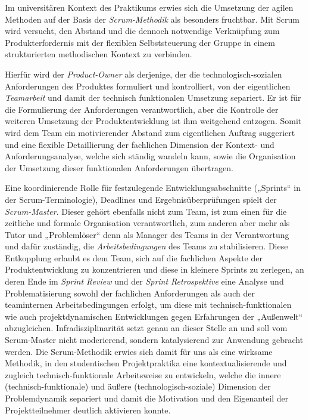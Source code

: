 \documentclass[a4paper,11pt]{article}
\begin{document}
Im universitären Kontext des Praktikums erwies sich die Umsetzung der agilen
Methoden auf der Basis der \emph{Scrum-Methodik} als besonders fruchtbar. Mit
Scrum wird versucht, den Abstand und die dennoch notwendige Verknüpfung zum
Produkterfordernis mit der flexiblen Selbststeuerung der Gruppe in einem
strukturierten methodischen Kontext zu verbinden.

Hierfür wird der \emph{Product-Owner} als derjenige, der die
technologisch-sozialen Anforderungen des Produktes formuliert und
kontrolliert, von der eigentlichen \emph{Teamarbeit} und damit der technisch
funktionalen Umsetzung separiert. Er ist für die Formulierung der
Anforderungen verantwortlich, aber die Kontrolle der weiteren Umsetzung der
Produktentwicklung ist ihm weitgehend entzogen. Somit wird dem Team ein
motivierender Abstand zum eigentlichen Auftrag suggeriert und eine flexible
Detaillierung der fachlichen Dimension der Kontext- und Anforderungsanalyse,
welche sich ständig wandeln kann, sowie die Organisation der Umsetzung dieser
funktionalen Anforderungen übertragen.

Eine koordinierende Rolle für festzulegende Entwicklungsabschnitte („Sprints“
in der Scrum-Terminologie), Deadlines und Ergebnisüberprüfungen spielt der
\emph{Scrum-Master}. Dieser gehört ebenfalls nicht zum Team, ist zum einen für
die zeitliche und formale Organisation verantwortlich, zum anderen aber mehr
als Tutor und „Problemlöser“ denn als Manager des Teams in der Verantwortung
und dafür zuständig, die \emph{Arbeitsbedingungen} des Teams zu
stabilisieren. Diese Entkopplung erlaubt es dem Team, sich auf die fachlichen
Aspekte der Produktentwicklung zu konzentrieren und diese in kleinere Sprints
zu zerlegen, an deren Ende im \emph{Sprint Review} und der \emph{Sprint
  Retrospektive} eine Analyse und Problematisierung sowohl der fachlichen
Anforderungen als auch der teaminternen Arbeitsbedingungen erfolgt, um diese
mit technisch-funktionalen wie auch projektdynamischen Entwicklungen gegen
Erfahrungen der „Außenwelt“ abzugleichen. Infradisziplinarität setzt genau an
dieser Stelle an und soll vom Scrum-Master nicht moderierend, sondern
katalysierend zur Anwendung gebracht werden. Die Scrum-Methodik erwies sich
damit für uns als eine wirksame Methodik, in den studentischen Projektpraktika
eine kontextualisierende und zugleich technisch-funktionale Arbeitsweise zu
entwickeln, welche die innere (technisch-funktionale) und äußere
(technologisch-soziale) Dimension der Problemdynamik separiert und damit die
Motivation und den Eigenanteil der Projektteilnehmer deutlich aktivieren
konnte.
\end{document}
